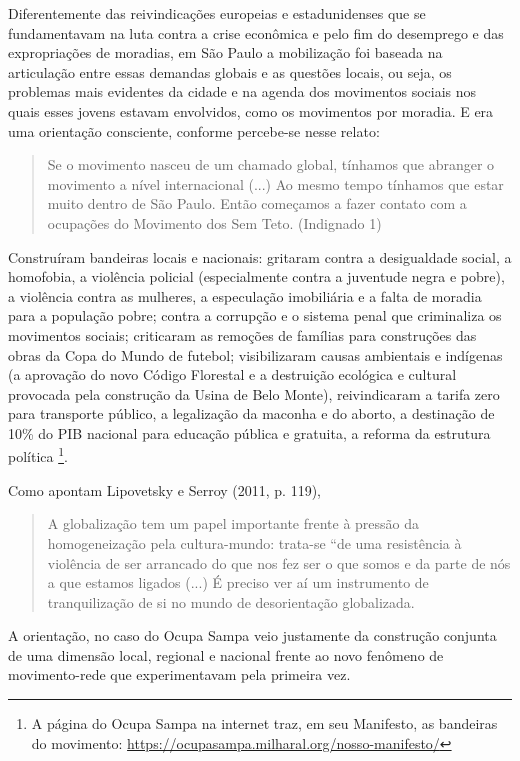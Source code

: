 Diferentemente das reivindicações europeias e estadunidenses que se
fundamentavam na luta contra a crise econômica e pelo fim do desemprego
e das expropriações de moradias, em São Paulo a mobilização foi baseada
na articulação entre essas demandas globais e as questões locais, ou
seja, os problemas mais evidentes da cidade e na agenda dos movimentos
sociais nos quais esses jovens estavam envolvidos, como os movimentos
por moradia. E era uma orientação consciente, conforme percebe-se nesse
relato:

\begin{quote}
Se o movimento nasceu de um chamado global, tínhamos que abranger o
movimento a nível internacional (...) Ao mesmo tempo tínhamos que estar
muito dentro de São Paulo. Então começamos a fazer contato com a
ocupações do Movimento dos Sem Teto. (Indignado 1)
\end{quote}

Construíram bandeiras locais e nacionais: gritaram contra a desigualdade
social, a homofobia, a violência policial (especialmente contra a
juventude negra e pobre), a violência contra as mulheres, a especulação
imobiliária e a falta de moradia para a população pobre; contra a
corrupção e o sistema penal que criminaliza os movimentos sociais;
criticaram as remoções de famílias para construções das obras da Copa do
Mundo de futebol; visibilizaram causas ambientais e indígenas (a
aprovação do novo Código Florestal e a destruição ecológica e cultural
provocada pela construção da Usina de Belo Monte), reivindicaram a
tarifa zero para transporte público, a legalização da maconha e do
aborto, a destinação de 10\% do PIB nacional para educação pública e
gratuita, a reforma da estrutura política \footnote{A página do Ocupa
  Sampa na internet traz, em seu Manifesto, as bandeiras do movimento:
  \url{https://ocupasampa.milharal.org/nosso-manifesto/}}.

Como apontam Lipovetsky e Serroy (2011, p. 119),

\begin{quote}
A globalização tem um papel importante frente à pressão da
homogeneização pela cultura-mundo: trata-se ``de uma resistência à
violência de ser arrancado do que nos fez ser o que somos e da parte de
nós a que estamos ligados (...) É preciso ver aí um instrumento de
tranquilização de si no mundo de desorientação globalizada.
\end{quote}

A orientação, no caso do Ocupa Sampa veio justamente da construção
conjunta de uma dimensão local, regional e nacional frente ao novo
fenômeno de movimento-rede que experimentavam pela primeira vez.

